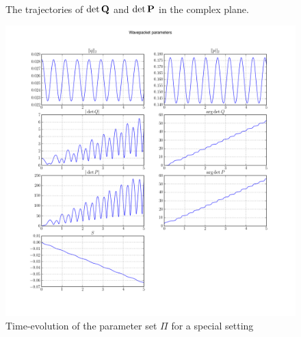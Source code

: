 \begin{figure}[ht!]
  \centering
   \\
  \caption[Trajectories of the spreads for a special setting]{
    The trajectories of $\det\mathbf{Q}$ and $\det\mathbf{P}$ in the complex plane.
    \label{fig:conic_circle_trajectories_spreads}
  }
\end{figure}

\begin{figure}
  \centering
  \includegraphics[width=\linewidth]{./results/conic_circle/wavepacket_parameters_abs_ang_block0.png}
  \caption{Time-evolution of the parameter set $\Pi$ for a special setting}
  \label{fig:conic_circle_parameters}
\end{figure}

